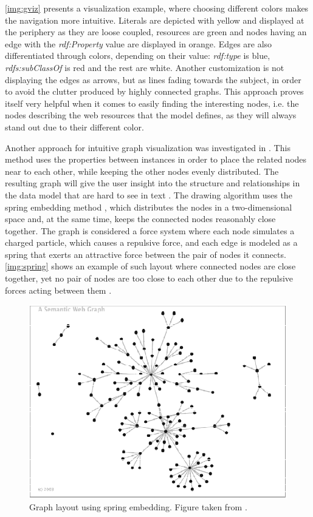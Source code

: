 \autoref{img:gviz} presents a visualization example, where choosing different colors makes the navigation more intuitive. Literals are depicted with yellow and displayed at the periphery as they are loose coupled, resources are green and nodes having an edge with the \textit{rdf:Property} value are displayed in orange. Edges are also differentiated through colors, depending on their value: \textit{rdf:type} is blue, \textit{rdfs:subClassOf} is red and the rest are white. Another customization is not displaying the edges as arrows, but as lines fading towards the subject, in order to avoid the clutter produced by highly connected graphs. This approach proves itself very helpful when it comes to easily finding the interesting nodes, i.e. the nodes describing the web resources that the model defines, as they will always stand out due to their different color.

Another approach for intuitive graph visualization was investigated in \cite{Mutton2003}. This method uses the properties between instances in order to place the related nodes near to each other, while keeping the other nodes evenly distributed. The resulting graph will give the user insight into the structure and relationships in the data model that are hard to see in text \cite{Mutton2003}. The drawing algorithm uses the spring embedding method \cite{Fruchterman1991}, which distributes the nodes in a two-dimensional space and, at the same time, keeps the connected nodes reasonably close together. The graph is considered a force system where each node simulates a charged particle, which causes a repulsive force, and each edge is modeled as a spring that exerts an attractive force between the pair of nodes it connects. \autoref{img:spring} shows an example of such layout where connected nodes are close together, yet no pair of nodes are too close to each other due to the repulsive forces acting between them \cite{Mutton2003}.

\begin{figure}[!htbp]
	\centering
  	\centerline{\includegraphics[width=0.7\linewidth]{img/spring.png}}
	\caption{Graph layout using spring embedding. Figure taken from \cite{Mutton2003}.}
	\label{img:spring}
\end{figure}














